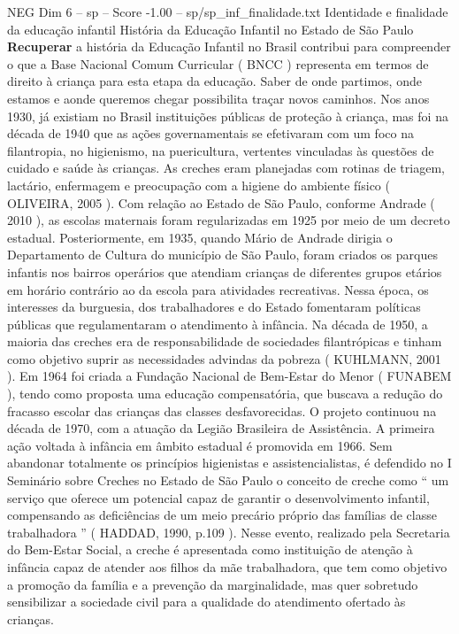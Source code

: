 \begin{textsample}{NEG Dim 6 – sp – Score -1.00 – sp/sp\_inf\_finalidade.txt}  \label{ex:f6_neg_201}
Identidade e finalidade da educação infantil História da Educação Infantil no Estado de São Paulo \textbf{Recuperar} a história da Educação Infantil no Brasil contribui para compreender o que a Base Nacional Comum Curricular ( BNCC ) representa em termos de direito à criança para esta etapa da educação.
Saber de onde partimos, onde estamos e aonde queremos chegar possibilita traçar novos caminhos.
Nos anos 1930, já existiam no Brasil instituições públicas de proteção à criança, mas foi na década de 1940 que as ações governamentais se efetivaram com um foco na filantropia, no higienismo, na puericultura, vertentes vinculadas às questões de cuidado e saúde às crianças.
As creches eram planejadas com rotinas de triagem, lactário, enfermagem e preocupação com a higiene do ambiente físico ( OLIVEIRA, 2005 ).
Com relação ao Estado de São Paulo, conforme Andrade ( 2010 ), as escolas maternais foram regularizadas em 1925 por meio de um decreto estadual.
Posteriormente, em 1935, quando Mário de Andrade dirigia o Departamento de Cultura do município de São Paulo, foram criados os parques infantis nos bairros operários que atendiam crianças de diferentes grupos etários em horário contrário ao da escola para atividades recreativas.
Nessa época, os interesses da burguesia, dos trabalhadores e do Estado fomentaram políticas públicas que regulamentaram o atendimento à infância.
Na década de 1950, a maioria das creches era de responsabilidade de sociedades filantrópicas e tinham como objetivo suprir as necessidades advindas da pobreza ( KUHLMANN, 2001 ).
Em 1964 foi criada a Fundação Nacional de Bem-Estar do Menor ( FUNABEM ), tendo como proposta uma educação compensatória, que buscava a redução do fracasso escolar das crianças das classes desfavorecidas.
O projeto continuou na década de 1970, com a atuação da Legião Brasileira de Assistência.
A primeira ação voltada à infância em âmbito estadual é promovida em 1966.
Sem abandonar totalmente os princípios higienistas e assistencialistas, é defendido no I Seminário sobre Creches no Estado de São Paulo o conceito de creche como “ um serviço que oferece um potencial capaz de garantir o desenvolvimento infantil, compensando as deficiências de um meio precário próprio das famílias de classe trabalhadora ” ( HADDAD, 1990, p.109 ).
Nesse evento, realizado pela Secretaria do Bem-Estar Social, a creche é apresentada como instituição de atenção à infância capaz de atender aos filhos da mãe trabalhadora, que tem como objetivo a promoção da família e a prevenção da marginalidade, mas quer sobretudo sensibilizar a sociedade civil para a qualidade do atendimento ofertado às crianças.

\end{textsample}
